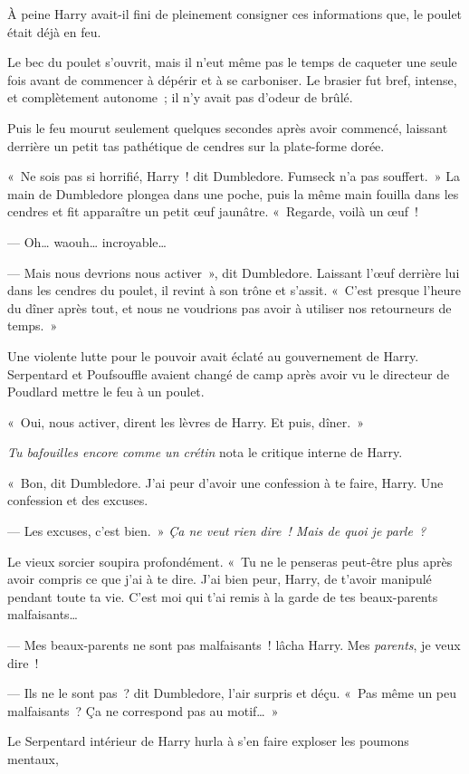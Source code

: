 À peine Harry avait-il fini de pleinement consigner ces informations que, le poulet était déjà en feu.

Le bec du poulet s'ouvrit, mais il n'eut même pas le temps de caqueter une seule fois avant de commencer à dépérir et à se carboniser.
Le brasier fut bref, intense, et complètement autonome~; il n'y avait pas d'odeur de brûlé.

Puis le feu mourut seulement quelques secondes après avoir commencé, laissant derrière un petit tas pathétique de cendres sur la plate-forme dorée.

«~Ne sois pas si horrifié, Harry~! dit Dumbledore.
Fumseck n'a pas souffert.~»
La main de Dumbledore plongea dans une poche, puis la même main fouilla dans les cendres et fit apparaître un petit œuf jaunâtre.
«~Regarde, voilà un œuf~!

--- Oh… waouh… incroyable…

--- Mais nous devrions nous activer~», dit Dumbledore.
Laissant l'œuf derrière lui dans les cendres du poulet, il revint à son trône et s'assit.
«~C'est presque l'heure du dîner après tout, et nous ne voudrions pas avoir à utiliser nos retourneurs de temps.~»

Une violente lutte pour le pouvoir avait éclaté au gouvernement de Harry.
Serpentard et Poufsouffle avaient changé de camp après avoir vu le directeur de Poudlard mettre le feu à un poulet.

«~Oui, nous activer, dirent les lèvres de Harry.
Et puis, dîner.~»

\emph{Tu bafouilles encore comme un crétin} nota le critique interne de Harry.

«~Bon, dit Dumbledore.
J'ai peur d'avoir une confession à te faire, Harry.
Une confession et des excuses.

--- Les excuses, c'est bien.~»
\emph{Ça ne veut rien dire~!
Mais de quoi je parle~?}

Le vieux sorcier soupira profondément.
«~Tu ne le penseras peut-être plus après avoir compris ce que j'ai à te dire.
J'ai bien peur, Harry, de t'avoir manipulé pendant toute ta vie.
C'est moi qui t'ai remis à la garde de tes beaux-parents malfaisants…

--- Mes beaux-parents ne sont pas malfaisants~! lâcha Harry.
Mes \emph{parents}, je veux dire~!

--- Ils ne le sont pas~? dit Dumbledore, l'air surpris et déçu.
«~Pas même un peu malfaisants~?
Ça ne correspond pas au motif…~»

Le Serpentard intérieur de Harry hurla à s'en faire exploser les poumons mentaux, 

